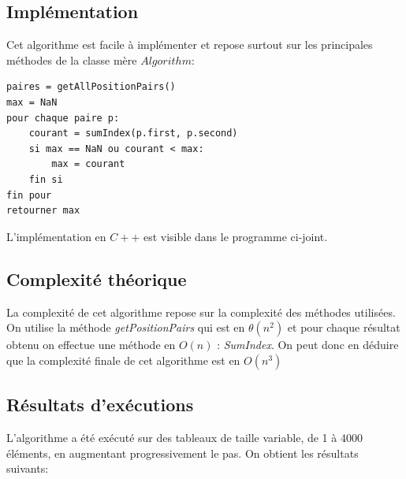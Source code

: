\documentclass[a4paper, 12pt]{article}
\begin{document}
\subsection{Implémentation}
Cet algorithme est facile à implémenter et repose surtout sur les principales méthodes de la classe mère $Algorithm$:
\begin{verbatim}
paires = getAllPositionPairs()
max = NaN
pour chaque paire p:
    courant = sumIndex(p.first, p.second)
    si max == NaN ou courant < max:
        max = courant
    fin si
fin pour
retourner max
\end{verbatim}
L'implémentation en $C++$ est visible dans le programme ci-joint.
\subsection{Complexité théorique}
La complexité de cet algorithme repose sur la complexité des méthodes utilisées. 
On utilise la méthode \emph{getPositionPairs} qui est en $\theta(n^2)$ et pour chaque résultat obtenu on effectue une méthode en $O(n)$  : \emph{SumIndex}.
On peut donc en déduire que la complexité finale de cet algorithme est en $O(n^3)$

\subsection{Résultats d’exécutions}
L'algorithme a été exécuté sur des tableaux de taille variable, de 1 à 4000 éléments, en augmentant progressivement le pas. On obtient les résultats suivants:
\end{document}
